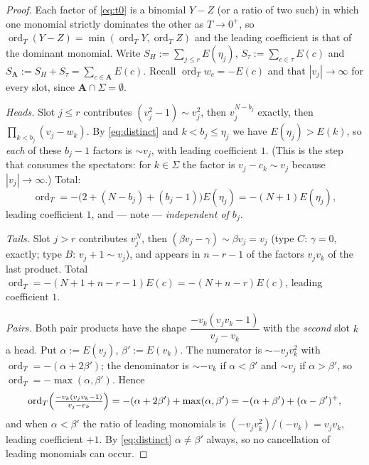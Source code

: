 \documentclass[11pt]{article}
\theoremstyle{plain}
\theoremstyle{definition}
\newcommand{\bA}{\mathbf{A}}
\newcommand{\ord}{\operatorname{ord}}
\begin{document}
\begin{proof}
Each factor of \eqref{eq:t0} is a binomial $Y-Z$ (or a ratio of two such) in which
one monomial strictly dominates the other as $T\to0^{+}$, so
$\ord_T(Y-Z)=\min(\ord_T Y,\ord_T Z)$ and the leading coefficient is that of the
dominant monomial.  Write $S_H:=\sum_{j\le r}E(\eta_j)$,
$S_\tau:=\sum_{c\in\tau}E(c)$ and $S_{\bA}:=S_H+S_\tau=\sum_{c\in\bA}E(c)$.
Recall $\ord_T w_c=-E(c)$ and that $|v_j|\to\infty$ for every slot, since
$\bA\cap\Sigma=\emptyset$.

\emph{Heads.}  Slot $j\le r$ contributes
$(v_j^{2}-1)\sim v_j^{2}$, then $v_j^{N-b_j}$ exactly, then
$\prod_{k<b_j}(v_j-w_k)$.  By \eqref{eq:distinct} and $k<b_j\le\eta_j$ we have
$E(\eta_j)>E(k)$, so \emph{each} of these $b_j-1$ factors is $\sim v_j$, with
leading coefficient $1$.  (This is the step that consumes the spectators: for
$k\in\Sigma$ the factor is $v_j-c_k\sim v_j$ because $|v_j|\to\infty$.)  Total:
\[
  \ord_T=-\bigl(2+(N-b_j)+(b_j-1)\bigr)E(\eta_j)=-(N+1)E(\eta_j),
\]
leading coefficient $1$, and --- note --- \emph{independent of $b_j$}.

\emph{Tails.}  Slot $j>r$ contributes $v_j^{N}$, then $(\beta v_j-\gamma)\sim\beta
v_j=v_j$ (type $C$: $\gamma=0$, exactly; type $B$: $v_j+1\sim v_j$), and appears
in $n-r-1$ of the factors $v_jv_k$ of the last product.  Total
$\ord_T=-(N+1+n-r-1)E(c)=-(N+n-r)E(c)$, leading coefficient $1$.

\emph{Pairs.}  Both pair products have the shape
$\dfrac{-v_k(v_jv_k-1)}{v_j-v_k}$ with the \emph{second} slot $k$ a head.  Put
$\alpha:=E(v_j)$, $\beta':=E(v_k)$.  The numerator is $\sim -v_jv_k^{2}$ with
$\ord_T=-(\alpha+2\beta')$; the denominator is $\sim-v_k$ if $\alpha<\beta'$ and
$\sim v_j$ if $\alpha>\beta'$, so $\ord_T=-\max(\alpha,\beta')$.  Hence
\[
  \ord_T\Bigl(\tfrac{-v_k(v_jv_k-1)}{v_j-v_k}\Bigr)
  =-(\alpha+2\beta')+\max(\alpha,\beta')
  =-(\alpha+\beta')+(\alpha-\beta')^{+},
\]
and when $\alpha<\beta'$ the ratio of leading monomials is
$(-v_jv_k^{2})/(-v_k)=v_jv_k$, leading coefficient $+1$.  By
\eqref{eq:distinct} $\alpha\ne\beta'$ always, so no cancellation of leading
monomials can occur.


\end{proof}
\end{document}
